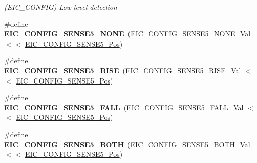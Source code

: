 \begin{DoxyCompactItemize}
\begin{DoxyCompactList}\small\item\em (E\+I\+C\+\_\+\+C\+O\+N\+F\+I\+G) Low level detection \end{DoxyCompactList}\item 
\hypertarget{group___s_a_m_l21___e_i_c_ga9de75fb4e0ca1290179613d6bcb55631}{}\#define {\bfseries E\+I\+C\+\_\+\+C\+O\+N\+F\+I\+G\+\_\+\+S\+E\+N\+S\+E5\+\_\+\+N\+O\+N\+E}~(\hyperlink{group___s_a_m_l21___e_i_c_ga1f73b11cdad345f444d6267c016e7d06}{E\+I\+C\+\_\+\+C\+O\+N\+F\+I\+G\+\_\+\+S\+E\+N\+S\+E5\+\_\+\+N\+O\+N\+E\+\_\+\+Val}    $<$$<$ \hyperlink{group___s_a_m_l21___e_i_c_gace7caae074bf08e88805b591c626fb7f}{E\+I\+C\+\_\+\+C\+O\+N\+F\+I\+G\+\_\+\+S\+E\+N\+S\+E5\+\_\+\+Pos})\label{group___s_a_m_l21___e_i_c_ga9de75fb4e0ca1290179613d6bcb55631}

\item 
\hypertarget{group___s_a_m_l21___e_i_c_gac0a8b0ca8b52ba680ded94efc88f3c4f}{}\#define {\bfseries E\+I\+C\+\_\+\+C\+O\+N\+F\+I\+G\+\_\+\+S\+E\+N\+S\+E5\+\_\+\+R\+I\+S\+E}~(\hyperlink{group___s_a_m_l21___e_i_c_gaa79135e0c433132db7b3df88472fda74}{E\+I\+C\+\_\+\+C\+O\+N\+F\+I\+G\+\_\+\+S\+E\+N\+S\+E5\+\_\+\+R\+I\+S\+E\+\_\+\+Val}    $<$$<$ \hyperlink{group___s_a_m_l21___e_i_c_gace7caae074bf08e88805b591c626fb7f}{E\+I\+C\+\_\+\+C\+O\+N\+F\+I\+G\+\_\+\+S\+E\+N\+S\+E5\+\_\+\+Pos})\label{group___s_a_m_l21___e_i_c_gac0a8b0ca8b52ba680ded94efc88f3c4f}

\item 
\hypertarget{group___s_a_m_l21___e_i_c_ga2bed9ee5946a92d537ab465bba113860}{}\#define {\bfseries E\+I\+C\+\_\+\+C\+O\+N\+F\+I\+G\+\_\+\+S\+E\+N\+S\+E5\+\_\+\+F\+A\+L\+L}~(\hyperlink{group___s_a_m_l21___e_i_c_ga2f575e054321eef78315a123006b62dc}{E\+I\+C\+\_\+\+C\+O\+N\+F\+I\+G\+\_\+\+S\+E\+N\+S\+E5\+\_\+\+F\+A\+L\+L\+\_\+\+Val}    $<$$<$ \hyperlink{group___s_a_m_l21___e_i_c_gace7caae074bf08e88805b591c626fb7f}{E\+I\+C\+\_\+\+C\+O\+N\+F\+I\+G\+\_\+\+S\+E\+N\+S\+E5\+\_\+\+Pos})\label{group___s_a_m_l21___e_i_c_ga2bed9ee5946a92d537ab465bba113860}

\item 
\hypertarget{group___s_a_m_l21___e_i_c_ga4b3ac1d5fdffe8ace39887ccabede68b}{}\#define {\bfseries E\+I\+C\+\_\+\+C\+O\+N\+F\+I\+G\+\_\+\+S\+E\+N\+S\+E5\+\_\+\+B\+O\+T\+H}~(\hyperlink{group___s_a_m_l21___e_i_c_ga020047d3418afa7b60b72bfc4872bfb0}{E\+I\+C\+\_\+\+C\+O\+N\+F\+I\+G\+\_\+\+S\+E\+N\+S\+E5\+\_\+\+B\+O\+T\+H\+\_\+\+Val}    $<$$<$ \hyperlink{group___s_a_m_l21___e_i_c_gace7caae074bf08e88805b591c626fb7f}{E\+I\+C\+\_\+\+C\+O\+N\+F\+I\+G\+\_\+\+S\+E\+N\+S\+E5\+\_\+\+Pos})\label{group___s_a_m_l21___e_i_c_ga4b3ac1d5fdffe8ace39887ccabede68b}


\end{DoxyCompactItemize}
